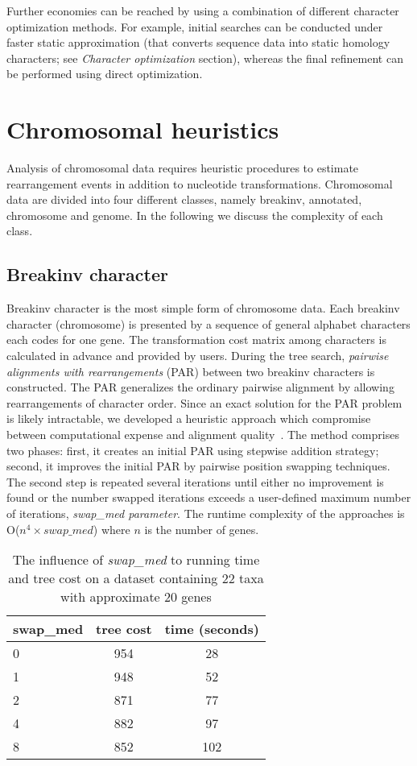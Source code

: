 Further economies can be reached by using a combination of different character optimization methods. For example, initial searches can be conducted under faster static approximation (that converts sequence data into static homology characters; see \emph{Character optimization} section), whereas the final refinement can be performed using direct optimization.

\section{Chromosomal heuristics}
Analysis of chromosomal data requires heuristic procedures to estimate
rearrangement events in addition to nucleotide transformations. Chromosomal
data are divided into four different classes, namely breakinv, annotated, 
chromosome and genome. In the following we discuss the complexity of
each class.

\subsection{Breakinv character}
Breakinv character is the most simple form of chromosome data. Each breakinv
character (chromosome) is presented by a sequence of general alphabet characters each codes for
one gene. The transformation cost matrix among characters is calculated in advance
and provided by users. During the tree search, \emph{pairwise alignments with rearrangements} (PAR) 
between two breakinv characters is constructed.
The PAR generalizes the ordinary pairwise alignment by allowing rearrangements of character order. 
Since an exact solution for the PAR problem is likely intractable, we developed
a heuristic approach which compromise between computational expense and
alignment quality~\cite{vinh2006}. The method comprises two phases: first, it
creates an initial PAR using stepwise addition strategy; second, it improves the 
initial PAR by pairwise position swapping techniques. The second step is
repeated several iterations until either no improvement is found or the number
swapped iterations exceeds a user-defined maximum number of iterations,
\emph{swap\_med parameter}. 
The runtime complexity of the approaches is O($n^4 \times swap\_med$) where $n$ is 
the number of genes.

\begin{table}[t]
\caption{The influence of \emph{swap\_med} to running time and tree cost
         on a dataset containing 22 taxa with approximate 20 genes}
\label{swapMedComp} 
\begin{center}
\begin{tabular}{l c c}
\hline
	swap\_med & tree cost & time (seconds) \\
\hline
 	   0 		& 954 &   28 \\
 	   1 		& 948 &   52 \\
 	   2 		& 871 &   77 \\
 	   4 		& 882 &   97 \\
 	   8 		& 852 &   102 \\
\hline
\end{tabular}
\end{center}
\end{table}

